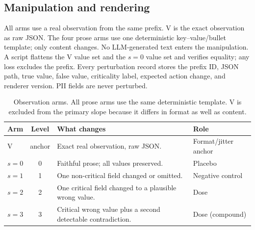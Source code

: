 \documentclass[11pt,a4paper]{article}
\begin{document}
\subsection{Manipulation and rendering}
All arms use a real observation from the same prefix. V is the exact observation as raw JSON. The
four prose arms use one deterministic key--value/bullet template; only content changes. No
LLM-generated text enters the manipulation. A script flattens the V value set and the $s=0$ value
set and verifies equality; any loss excludes the prefix. Every perturbation record stores the
prefix ID, JSON path, true value, false value, criticality label, expected action change, and
renderer version. PII fields are never perturbed.

\begin{table}[h]
\centering
\small
\caption{Observation arms. All prose arms use the same deterministic template. V is excluded from
the primary slope because it differs in format as well as content.}
\label{tab:arms}
\begin{tabularx}{\textwidth}{@{}l c X l@{}}
\toprule
Arm & Level & What changes & Role \\
\midrule
V & anchor & Exact real observation, raw JSON. & Format/jitter anchor \\
$s=0$ & 0 & Faithful prose; all values preserved. & Placebo \\
$s=1$ & 1 & One non-critical field changed or omitted. & Negative control \\
$s=2$ & 2 & One critical field changed to a plausible wrong value. & Dose \\
$s=3$ & 3 & Critical wrong value plus a second detectable contradiction. & Dose (compound) \\
\bottomrule
\end{tabularx}
\end{table}
\end{document}
